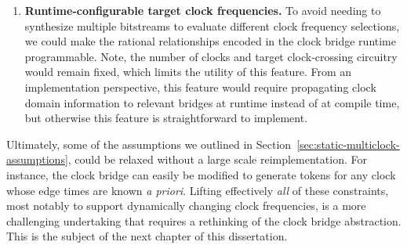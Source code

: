 \begin{enumerate}
\item \textbf{Runtime-configurable target clock frequencies.} To avoid needing to
synthesize multiple bitstreams to evaluate different clock frequency
selections, we could make the rational relationships encoded in the clock bridge runtime programmable.
Note, the number of clocks and target clock-crossing circuitry would remain
fixed, which limits the utility of this feature. From an implementation perspective, this feature would require propagating
clock domain information to relevant bridges at runtime instead of at compile time,
but otherwise this feature is straightforward to implement.
\end{enumerate}

Ultimately, some of the assumptions we outlined in
Section~\ref{sec:static-multiclock-assumptions}, could be relaxed without a
large scale reimplementation. For instance, the clock bridge can easily be
modified to generate tokens for any clock whose edge times are known \emph{a priori}.
Lifting effectively \emph{all} of these constraints, most notably to
support dynamically changing clock frequencies, is a more challenging
undertaking that requires a rethinking of the clock bridge abstraction. This is the
subject of the next chapter of this dissertation.

